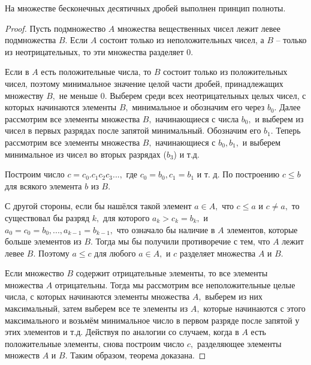 \begin{theorem}
    На множестве бесконечных
    десятичных дробей выполнен принцип полноты.
\end{theorem}
\begin{proof}
    Пусть подмножество $A$
    множества вещественных чисел
    лежит левее подмножества $B.$
    Если $A$ состоит только из
    неположительных чисел, а $B$ --
    только из неотрицательных, то
    эти множества разделяет 0.

    Если в $A$ есть положительные
    числа, то $B$ состоит только
    из положительных чисел, поэтому
    минимальное значение целой части
    дробей, принадлежащих множеству
    $B,$ не меньше 0. Выберем среди
    всех неотрицательных целых
    чисел, с которых начинаются
    элементы $B,$ минимальное
    и обозначим его через $b_0.$
    Далее рассмотрим все элементы
    множества $B,$ начинающиеся
    с числа $b_0,$ и выберем
    из чисел в первых разрядах
    после запятой минимальный.
    Обозначим его $b_1.$ Теперь
    рассмотрим все элементы множества
    $B,$ начинающиеся с $b_0,b_1,$
    и выберем минимальное из чисел во
    вторых разрядах ($b_3$) и т.д.

    Построим число $c=c_0. c_1c_2c_3
        ...,$ где $c_0=b_0, c_1=b_1$ и
    т. д. По построению $c\leq b$
    для всякого элемента $b$ из
    $B.$

    С другой стороны, если бы нашёлся
    такой элемент $a\in A,$ что
    $c\leq a$  и $c\neq a,$
    то существовал бы разряд
    $k,$ для которого
    $a_k>c_k=b_k,$ и $a_0=c_0=b_0,
        ... ,a_{k-1}=b_{k-1},$ что означало
    бы наличие в $A$ элементов,
    которые больше элементов из $B.$
    Тогда мы бы получили противоречие
    с тем, что $A$ лежит левее $B.$
    Поэтому $a\leq c$ для любого $a\in A,$
    и $c$ разделяет множества $A$ и $B.$

    Если множество $B$ содержит
    отрицательные элементы, то все
    элементы множества $A$ отрицательны.
    Тогда мы рассмотрим
    все неположительные целые
    числа, с которых начинаются
    элементы множества $A,$
    выберем из них максимальный,
    затем выберем все те элементы
    из $A,$ которые начинаются с этого
    максимального и возьмём
    минимальное число в первом разряде
    после запятой у этих элементов и т.д.
    Действуя по аналогии со случаем,
    когда в $A$ есть положительные
    элементы, снова построим число
    $c,$ разделяющее элементы множеств
    $A$ и $B.$ Таким образом, теорема
    доказана.
\end{proof}

